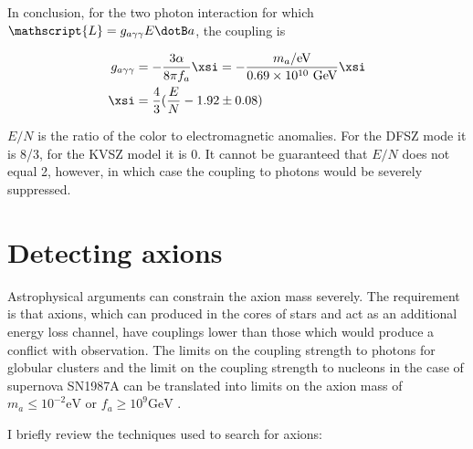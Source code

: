 \documentclass[12pt,twosides]{book}
\begin{document}
In conclusion, for the two photon interaction for which $\mathscript{L} = g_{a\gamma\gamma}E\dotB a$, the coupling is

\begin{align*}
g_{a\gamma\gamma} &= -\frac{3\alpha}{8\pi f_a}\xsi = - \frac{m_a/\text{eV}}{0.69\times10^{10}\text{ GeV}}\xsi 
\\ \xsi &= \frac{4}{3}(\frac{E}{N} - 1.92 \pm 0.08)
\end{align*}

$E/N$ is the ratio of the color to electromagnetic anomalies. For the DFSZ mode it is 8/3, for the KVSZ model it is 0. It cannot be guaranteed that $E/N$ does not equal 2, however, in which case the coupling to photons would be severely suppressed.


\section{Detecting axions}

Astrophysical arguments can constrain the axion mass severely. The requirement is that axions, which can produced in the cores of stars and act as an additional energy loss channel, have couplings lower than those which would produce a conflict with observation. The limits on the coupling strength to photons for globular clusters and the limit on the coupling strength to nucleons in the case of supernova SN1987A can be translated into limits on the axion mass of $m_a \leq 10^{-2} \text{eV}$ or $f_a \geq 10^9\text{GeV}$ \cite{raffelt08}.

I briefly review the techniques used to search for axions:
\end{document}
